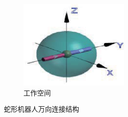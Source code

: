 \begin{figure}[h!]
	\begin{subfigure}{0.5\textwidth}
		\centering
		\includegraphics[width=0.6\textwidth,height=0.15\textheight]{figure/chap03/allspace.eps}
		\caption{工作空间}
		\label{fig:allspace}
	\end{subfigure}
	\caption{蛇形机器人万向连接结构}
	\label{fig:all}
\end{figure}


